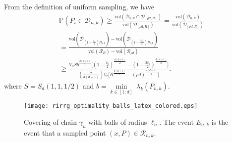 \documentclass[Afour,sageh,times]{sagej}
\begin{document}

From the definition of uniform sampling, we have 
\begin{align*}
     &\mathbb{P}(P_i\in\mathcal{D}_{n,k})
     {\geq}\frac{\text{vol}(\mathcal{D}_{n,k}\cap \mathcal{D}_{[\rho d, R]})}{\text{vol}(\mathcal{D}_{[\rho d ,R]})} = \frac{\text{vol}(\mathcal{D}_{n,k})}{\text{vol}(\mathcal{D}_{[\rho d,R]})} \\
    &=\frac{\text{vol}(\mathcal{D}_{(1-\frac{\delta_n}{2})P_{n,k}}) - \text{vol}(\mathcal{D}_{(1-\frac{3\delta_n}{2})P_{n,k}})}{\text{vol}(\mathcal{R}_{R}) - \text{vol}(\mathcal{R}_{\rho d})}\\
        &\geq\frac{V_dSb^{\frac{d(d+1)}{2}}\bigg[ (1-\frac{\delta_n}{2})^{\frac{d(d+1)}{2}}- (1-\frac{3\delta_n}{2})^{\frac{d(d+1)}{2}} \bigg]}{\left(\frac{2}{d(d+1)}\right)V_r\bigg[R^{\frac{d(d+1)}{2}}- (\rho d)^{\frac{d(d+1)}{2}} \bigg]}.
\end{align*}
where $S=S_d(1,1,1/2)$ and $b=\underset{k\in[1;d]}{\min}\;\lambda_k(P_{n,k})$.
\begin{figure}[ht!]
\centering
\texttt{[image: rirrg\_optimality\_balls\_latex\_colored.eps]}
\caption{Covering of chain $\gamma_n$ with balls of radius $\ell_n$. The event $E_{n,k}$ is the event that a sampled point $(x,P)\in\mathcal{R}_{n,k}$.}
\label{fig:covering_balls}
\end{figure}
\end{document}
